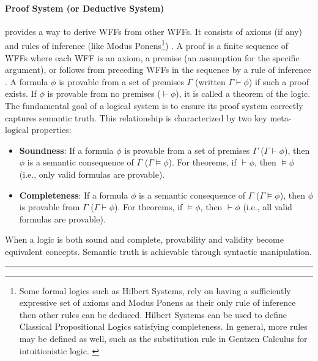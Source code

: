 \paragraph{Proof System (or Deductive System)} provides a way to derive WFFs from other WFFs. It consists of axioms (if any) and rules of inference (like Modus Ponens\footnote{Some formal logics such as Hilbert Systems, rely on having a sufficiently expressive set of axioms and Modus Ponens as their only rule of inference then other rules can be deduced\cite[Sec.~1.2, Def.~1.2.6]{Hajek1998}. Hilbert Systems can be used to define Classical Propositional Logics satisfying completeness. In general, more rules may be defined as well, such as the substitution rule in Gentzen Calculus for intuitionistic logic. \cite[p.~39,64]{ResiduatedLattices2007}}) \cite[Sec.~5.1, 5.3]{Agler2013SymbolicLogic}. A proof is a finite sequence of WFFs where each WFF is an axiom, a premise (an assumption for the specific argument), or follows from preceding WFFs in the sequence by a rule of inference \cite[Sec.~5.1]{Agler2013SymbolicLogic}. A formula $\phi$ is provable from a set of premises $\Gamma$ (written $\Gamma \vdash \phi$) if such a proof exists. If $\phi$ is provable from no premises ($\vdash \phi$), it is called a theorem of the logic.\\

The fundamental goal of a logical system is to ensure its proof system correctly captures semantic truth. This relationship is characterized by two key meta-logical properties:
\begin{itemize}
    \item \textbf{Soundness}: If a formula $\phi$ is provable from a set of premises $\Gamma$ ($\Gamma \vdash \phi$), then $\phi$ is a semantic consequence of $\Gamma$ ($\Gamma \models \phi$). For theorems, if $\vdash \phi$, then $\models \phi$ (i.e., only valid formulas are provable).\cite[Lemma~1.2.7]{Hajek1998}
    \item \textbf{Completeness}: If a formula $\phi$ is a semantic consequence of $\Gamma$ ($\Gamma \models \phi$), then $\phi$ is provable from $\Gamma$ ($\Gamma \vdash \phi$). For theorems, if $\models \phi$, then $\vdash \phi$ (i.e., all valid formulas are provable).\cite[Lemma~1.2.9]{Hajek1998}
\end{itemize}
When a logic is both sound and complete, provability and validity become equivalent concepts. Semantic truth is achievable through syntactic manipulation.\cite[Thm.~1.2.11]{Hajek1998}

\rule{\textwidth}{0.4mm}


